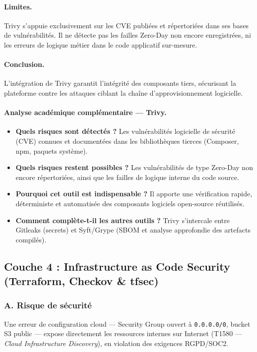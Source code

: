 \paragraph{Limites.}
Trivy s'appuie exclusivement sur les CVE publiées et répertoriées dans ses bases de vulnérabilités. Il ne détecte pas les failles Zero-Day non encore enregistrées, ni les erreurs de logique métier dans le code applicatif sur-mesure.

\paragraph{Conclusion.}
L'intégration de Trivy garantit l'intégrité des composants tiers, sécurisant la plateforme contre les attaques ciblant la chaîne d'approvisionnement logicielle.

\paragraph{Analyse académique complémentaire — Trivy.}
\begin{itemize}
    \item \textbf{Quels risques sont détectés ?} Les vulnérabilités logicielle de sécurité (CVE) connues et documentées dans les bibliothèques tierces (Composer, npm, paquets système).
    \item \textbf{Quels risques restent possibles ?} Les vulnérabilités de type Zero-Day non encore répertoriées, ainsi que les failles de logique interne du code source.
    \item \textbf{Pourquoi cet outil est indispensable ?} Il apporte une vérification rapide, déterministe et automatisée des composants logiciels open-source réutilisés.
    \item \textbf{Comment complète-t-il les autres outils ?} Trivy s'intercale entre Gitleaks (secrets) et Syft/Grype (SBOM et analyse approfondie des artefacts compilés).
\end{itemize}

\subsection{Couche 4 : Infrastructure as Code Security (Terraform, Checkov \& tfsec)}

\subsubsection{A. Risque de sécurité}
Une erreur de configuration cloud — Security Group ouvert à \texttt{0.0.0.0/0}, bucket S3 public — expose directement les ressources internes sur Internet (T1580 — \textit{Cloud Infrastructure Discovery}), en violation des exigences RGPD/SOC2.

